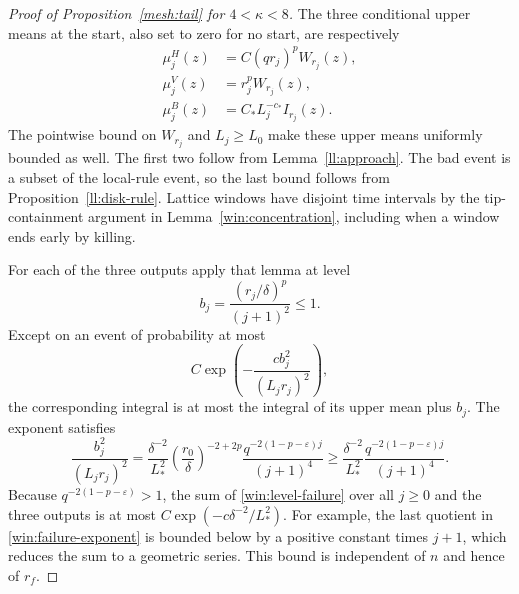 \begin{proof}[Proof of Proposition~\ref{mesh:tail} for $4<\kappa<8$]
The three conditional upper means at the start, also set to zero for
no start, are respectively
\begin{equation}
 \begin{split}
 \mu^H_j(z)&=C(qr_j)^pW_{r_j}(z),\\
 \mu^V_j(z)&=r_j^pW_{r_j}(z),\\
 \mu^B_j(z)&=C_*L_j^{-c_*}I_{r_j}(z).
 \end{split}
 \label{win:means}
\end{equation}
The pointwise bound on $W_{r_j}$ and $L_j\ge L_0$ make these upper
means uniformly bounded as well.
The first two follow from Lemma~\ref{ll:approach}.  The bad event is a
subset of the local-rule event, so the last bound follows from Proposition~\ref{ll:disk-rule}.  Lattice windows have disjoint time intervals by the
tip-containment argument in Lemma~\ref{win:concentration}, including
when a window ends early by killing.

For each of the three outputs apply that lemma at level
\[
 b_j=\frac{(r_j/\delta)^p}{(j+1)^2}\le1.
\]
Except on an event of probability at most
\begin{equation}
 C\exp\left(-\frac{c b_j^2}{(L_jr_j)^2}\right),
 \label{win:level-failure}
\end{equation}
the corresponding integral is at most the integral of its upper mean
plus $b_j$.  The exponent satisfies
\begin{equation}
 \frac{b_j^2}{(L_jr_j)^2}
 =\frac{\delta^{-2}}{L_*^2}
   \left(\frac{r_0}{\delta}\right)^{-2+2p}
   \frac{q^{-2(1-p-\varepsilon)j}}{(j+1)^4}
 \ge \frac{\delta^{-2}}{L_*^2}
   \frac{q^{-2(1-p-\varepsilon)j}}{(j+1)^4}.
 \label{win:failure-exponent}
\end{equation}
Because $q^{-2(1-p-\varepsilon)}>1$, the sum of
\eqref{win:level-failure} over all $j\ge0$ and the three outputs is
at most $C\exp(-c\delta^{-2}/L_*^2)$.  For example, the last quotient in
\eqref{win:failure-exponent} is bounded below by a positive constant
times $j+1$, which reduces the sum to a geometric series.  This bound
is independent of $n$ and hence of $r_f$.


\end{proof}
